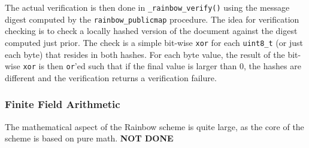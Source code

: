 The actual verification is then done in \texttt{\_rainbow\_verify()} using the message digest computed by the \texttt{rainbow\_publicmap} procedure. The idea for verification checking is to check a locally hashed version of the document against the digest computed just prior. The check is a simple bit-wise \texttt{xor} for each \texttt{uint8\_t} (or just each byte) that resides in both hashes. For each byte value, the result of the bit-wise \texttt{xor} is then \texttt{or}'ed such that if the final value is larger than 0, the hashes are different and the verification returns a verification failure.

\subsubsection{Finite Field Arithmetic}
The mathematical aspect of the Rainbow scheme is quite large, as the core of the scheme is based on pure math. \textbf{NOT DONE}

